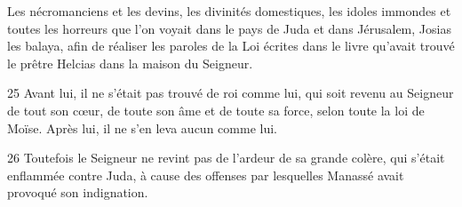 Les nécromanciens et les devins, les divinités domestiques, les idoles immondes et toutes les horreurs que l’on voyait dans le pays de Juda et dans Jérusalem, Josias les balaya, afin de réaliser les paroles de la Loi écrites dans le livre qu’avait trouvé le prêtre Helcias dans la maison du Seigneur.

25 Avant lui, il ne s’était pas trouvé de roi comme lui, qui soit revenu au Seigneur de tout son cœur, de toute son âme et de toute sa force, selon toute la loi de Moïse. Après lui, il ne s’en leva aucun comme lui.

26 Toutefois le Seigneur ne revint pas de l’ardeur de sa grande colère, qui s’était enflammée contre Juda, à cause des offenses par lesquelles Manassé avait provoqué son indignation.
